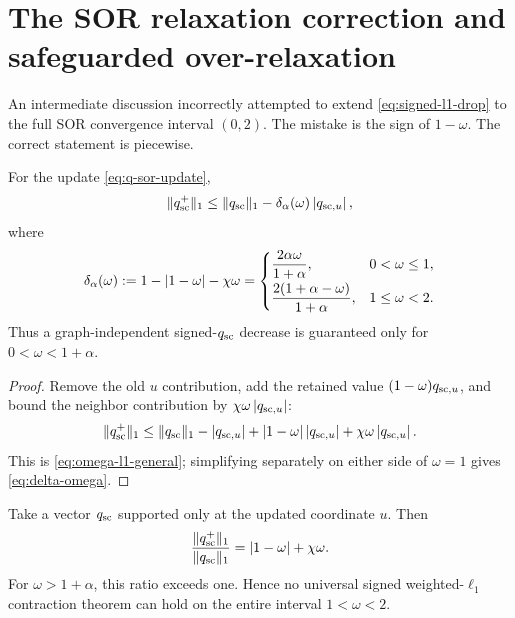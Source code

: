 \section{The SOR relaxation correction and safeguarded over-relaxation}
\label{sec:omega}

An intermediate discussion incorrectly attempted to extend
\cref{eq:signed-l1-drop} to the full SOR convergence interval $(0,2)$.  The
mistake is the sign of $1-\omega$.  The correct statement is piecewise.

\begin{lemma}
\label{lem:omega-l1}
For the update \cref{eq:q-sor-update},
\begin{equation}
  \lVert q_{\rm sc}^+\rVert_1
  \leq
  \lVert q_{\rm sc}\rVert_1-\delta_\alpha(\omega)\left\lvert q_{{\rm sc},u} \right\rvert,
  \label{eq:omega-l1-general}
\end{equation}
where
\begin{equation}
  \delta_\alpha(\omega)
  :=1-\left\lvert 1-\omega \right\rvert-\chi\omega
  =
  \begin{cases}
    \dfrac{2\alpha\omega}{1+\alpha},&0<\omega\leq1,\\[2mm]
    \dfrac{2(1+\alpha-\omega)}{1+\alpha},&1\leq\omega<2.
  \end{cases}
  \label{eq:delta-omega}
\end{equation}
Thus a graph-independent signed-$q_{\rm sc}$ decrease is guaranteed only for
$0<\omega<1+\alpha$.
\end{lemma}

\begin{proof}
Remove the old $u$ contribution, add the retained value
$(1-\omega)q_{{\rm sc},u}$, and bound the neighbor contribution by
$\chi\omega\left\lvert q_{{\rm sc},u} \right\rvert$:
\[
  \lVert q_{\rm sc}^+\rVert_1
  \leq
  \lVert q_{\rm sc}\rVert_1-\left\lvert q_{{\rm sc},u} \right\rvert
  +\left\lvert 1-\omega \right\rvert\left\lvert q_{{\rm sc},u} \right\rvert
  +\chi\omega\left\lvert q_{{\rm sc},u} \right\rvert.
\]
This is \cref{eq:omega-l1-general}; simplifying separately on either side of
$\omega=1$ gives \cref{eq:delta-omega}.
\end{proof}

\begin{proposition}
\label{prop:omega-counterexample}
Take a vector $q_{\rm sc}$ supported only at the updated coordinate $u$.  Then
\begin{equation}
  \frac{\lVert q_{\rm sc}^+\rVert_1}{\lVert q_{\rm sc}\rVert_1}
  =\left\lvert 1-\omega \right\rvert+\chi\omega.
  \label{eq:omega-counterexample}
\end{equation}
For $\omega>1+\alpha$, this ratio exceeds one.  Hence no universal signed
weighted-$\ell_1$ contraction theorem can hold on the entire interval
$1<\omega<2$.
\end{proposition}

